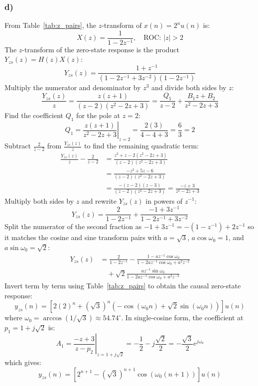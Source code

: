 \documentclass[12pt,a4paper]{article}
\begin{document}
\subsubsection*{d)}
From Table~\ref{tab:z_pairs}, the $z$-transform of $x(n) = 2^n u(n)$ is:
\[
X(z) = \frac{1}{1 - 2z^{-1}}, \quad \text{ROC: } |z| > 2
\]
The $z$-transform of the zero-state response is the product $Y_{zs}(z) = H(z)X(z)$:
\[
Y_{zs}(z) = \frac{1 + z^{-1}}{(1 - 2z^{-1} + 3z^{-2})(1 - 2z^{-1})}
\]
Multiply the numerator and denominator by $z^3$ and divide both sides by $z$:
\[
\frac{Y_{zs}(z)}{z} = \frac{z(z + 1)}{(z - 2)(z^2 - 2z + 3)} = \frac{Q_1}{z - 2} + \frac{B_1 z + B_2}{z^2 - 2z + 3}
\]
Find the coefficient $Q_1$ for the pole at $z = 2$:
\[
Q_1 = \left. \frac{z(z + 1)}{z^2 - 2z + 3} \right|_{z = 2} = \frac{2(3)}{4 - 4 + 3} = \frac{6}{3} = 2
\]
Subtract $\frac{2}{z - 2}$ from $\frac{Y_{zs}(z)}{z}$ to find the remaining quadratic term:
\[
\begin{aligned}
\frac{Y_{zs}(z)}{z} - \frac{2}{z - 2} &= \frac{z^2 + z - 2(z^2 - 2z + 3)}{(z - 2)(z^2 - 2z + 3)} \\
&= \frac{-z^2 + 5z - 6}{(z - 2)(z^2 - 2z + 3)} \\
&= \frac{-(z - 2)(z - 3)}{(z - 2)(z^2 - 2z + 3)} = \frac{-z + 3}{z^2 - 2z + 3}
\end{aligned}
\]
Multiply both sides by $z$ and rewrite $Y_{zs}(z)$ in powers of $z^{-1}$:
\[
Y_{zs}(z) = \frac{2}{1 - 2z^{-1}} + \frac{-1 + 3z^{-1}}{1 - 2z^{-1} + 3z^{-2}}
\]
Split the numerator of the second fraction as $-1 + 3z^{-1} = -(1 - z^{-1}) + 2z^{-1}$ so it matches the cosine and sine transform pairs with $a = \sqrt{3}$, $a\cos\omega_0 = 1$, and $a\sin\omega_0 = \sqrt{2}$:
\[
\begin{aligned}
Y_{zs}(z) &= \frac{2}{1 - 2z^{-1}} - \frac{1 - az^{-1}\cos\omega_0}{1 - 2az^{-1}\cos\omega_0 + a^2 z^{-2}} \\
&\quad + \sqrt{2}\frac{az^{-1}\sin\omega_0}{1 - 2az^{-1}\cos\omega_0 + a^2 z^{-2}}
\end{aligned}
\]
Invert term by term using Table~\ref{tab:z_pairs} to obtain the causal zero-state response:
\[
y_{zs}(n) = \left[2(2)^n + (\sqrt{3})^n \left(-\cos(\omega_0 n) + \sqrt{2}\sin(\omega_0 n)\right)\right]u(n)
\]
where $\omega_0 = \arccos(1/\sqrt{3}) \approx 54.74^\circ$. In single-cosine form, the coefficient at $p_1 = 1 + j\sqrt{2}$ is:
\[
A_1 = \left. \frac{-z + 3}{z - p_2} \right|_{z = 1 + j\sqrt{2}} = -\frac{1}{2} - j\frac{\sqrt{2}}{2} = -\frac{\sqrt{3}}{2}e^{j\omega_0}
\]
which gives:
\[
y_{zs}(n) = \left[2^{n+1} - (\sqrt{3})^{n+1}\cos\left(\omega_0(n + 1)\right)\right]u(n)
\]
\end{document}
